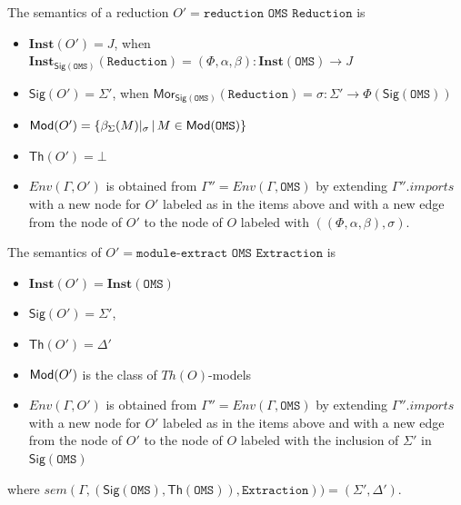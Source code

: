 \documentclass[10pt,fleqn,final]{scrreprt}
\newcommand*{\syntax}[1]{\texttt{#1}}
\newcommand{\Sig}{\mathsf{Sig}}
\renewcommand{\Th}{\mathsf{Th}}
\newcommand{\Mor}{\mathsf{Mor}}
\newcommand{\Inst}{\ensuremath{\mathbf{Inst}}}
\newenvironment{definitions}[0]{\medskip }{}
\begin{document}
\begin{definitions}
The semantics of a reduction
$O' = \syntax{reduction OMS  Reduction}$
is
\begin{itemize}

  \item $\Inst(O') = J$, when $\Inst_{\Sig(\syntax{OMS})}(\syntax{Reduction})
  = (\Phi, \alpha, \beta) : \Inst(\syntax{OMS}) \to J$
  \item $\Sig(O') = \Sigma'$, when
   $\Mor_{\Sig(\syntax{OMS})}(\syntax{Reduction}) = \sigma:\Sigma'\to
    \Phi(\Sig(\syntax{OMS}))$
  \item $\Mod(O') = \{\beta_\Sigma(M)\forget{\sigma} \,|\, M\in \Mod(\syntax{OMS})\}$
  \item $\Th(O') = \bot$
  \item $Env(\Gamma, O')$ is obtained from 
       $\Gamma'' = Env(\Gamma, \syntax{OMS})$
       by extending $\Gamma''.imports$
        with a new node for $O'$ labeled as in the items above
        and with a new edge from the node of $O'$ to the node of $O$ labeled with
        $((\Phi, \alpha, \beta),\sigma)$.

\end{itemize}


The semantics of $O' = \syntax{module-extract OMS 
Extraction}$ is
\begin{itemize}
  \item $\Inst(O') = \Inst(\syntax{OMS})$
  \item $\Sig(O') = \Sigma'$,
     
  \item $\Th(O') = \Delta'$
  \item $\mathsf{Mod}(O')$ is the class of $Th(O)$-models
  \item $Env(\Gamma, O')$ is obtained from 
       $\Gamma'' = Env(\Gamma, \syntax{OMS})$
       by extending $\Gamma''.imports$
        with a new node for $O'$ labeled as in the items above
        and with a new edge from the node of $O'$ to the node of $O$ labeled with
        the inclusion of $\Sigma'$ in $\Sig(\syntax{OMS})$
\end{itemize}
where 
$sem(\Gamma, (\Sig(\syntax{OMS}), \Th(\syntax{OMS})), \syntax{Extraction})) = 
(\Sigma',\Delta')$.


\end{definitions}
\end{document}
